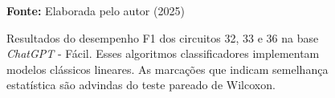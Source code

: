 \begin{figure}
\caption{Resultados do desempenho F1 dos circuitos 32, 33 e 36 na base \textit{ChatGPT} - Fácil. Esses algoritmos classificadores implementam modelos clássicos lineares. As marcações que indicam semelhança estatística são advindas do teste pareado de Wilcoxon.}
\label{fig:f1:easy:g4}
     \centering
    \centering

      \par\medskip\ABNTEXfontereduzida\selectfont\textbf{Fonte:} Elaborada pelo autor (2025) \par\medskip
\end{figure}